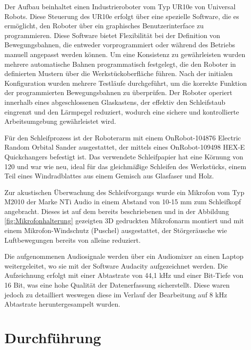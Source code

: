 Der Aufbau beinhaltet einen Industrieroboter vom Typ UR10e von Universal Robots. Diese Steuerung des UR10e erfolgt über eine spezielle Software, die es ermöglicht, den Roboter über ein graphisches Benutzerinterface zu programmieren. Diese Software bietet Flexibilität bei der Definition von Bewegungsbahnen, die entweder vorprogrammiert oder während des Betriebs manuell angepasst werden können. Um eine Konsistenz zu gewährleisten wurden mehrere automatische Bahnen programmatisch festgelegt, die den Roboter in definierten Mustern über die Werkstückoberfläche führen. Nach der initialen Konfiguration wurden mehrere Testläufe durchgeführt, um die korrekte Funktion der programmierten Bewegungsbahnen zu überprüfen. Der Roboter operiert innerhalb eines abgeschlossenen Glaskastens, der effektiv den Schleifstaub eingrenzt und den Lärmpegel reduziert, wodurch eine sichere und kontrollierte Arbeitsumgebung gewährleistet wird.

Für den Schleifprozess ist der Roboterarm mit einem OnRobot-104876 Electric Random Orbital Sander ausgestattet, der mittels eines OnRobot-109498 HEX-E Quickchangers befestigt ist. Das verwendete Schleifpapier hat eine Körnung von 120 und war wie neu, ideal für das gleichmäßige Schleifen des Werkstücks, einem Teil eines Windradblattes aus einem Gemisch aus Glasfaser und Holz.

Zur akustischen Überwachung des Schleifvorgangs wurde ein Mikrofon vom Typ M2010 der Marke NTi Audio in einem Abstand von 10-15 mm zum Schleifkopf angebracht. Dieses ist auf dem bereits beschriebenen und in der Abbildung \ref{fig:Mikrofonhalterung} gezeigten 3D gedruckten Mikrofonarm montiert und mit einem Mikrofon-Windschutz (Puschel) ausgestattet, der Störgeräusche wie Luftbewegungen bereits von alleine reduziert.

Die aufgenommenen Audiosignale werden über ein Audiomixer an einen Laptop weitergeleitet, wo sie mit der Software Audacity aufgezeichnet werden. Die Aufzeichnung erfolgt mit einer Abtastrate von 44,1 kHz und einer Bit-Tiefe von 16 Bit, was eine hohe Qualität der Datenerfassung sicherstellt. Diese waren jedoch zu detailliert weswegen diese im Verlauf der Bearbeitung auf 8 kHz Abtastrate heruntergesampelt wurden.

\section{Durchführung}

